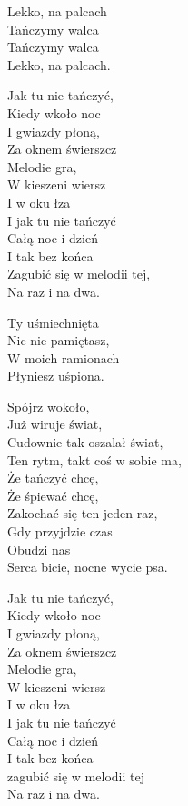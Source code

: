 \begin{text}
    Lekko, na palcach\\
    Tańczymy walca\\
    Tańczymy walca\\
    Lekko, na palcach.

    Jak tu nie tańczyć,\\
    Kiedy wkoło noc\\
    I gwiazdy płoną,\\
    Za oknem świerszcz\\
    Melodie gra,\\
    W kieszeni wiersz\\
    I w oku łza\\
    I jak tu nie tańczyć\\
    Całą noc i dzień\\
    I tak bez końca\\
    Zagubić się w melodii tej,\\
    Na raz i na dwa.

    Ty uśmiechnięta\\
    Nic nie pamiętasz,\\
    W moich ramionach\\
    Płyniesz uśpiona.

    Spójrz wokoło,\\
    Już wiruje świat,\\
    Cudownie tak oszalał świat,\\
    Ten rytm, takt coś w sobie ma,\\
    Że tańczyć chcę,\\
    Że śpiewać chcę,\\
    Zakochać się ten jeden raz,\\
    Gdy przyjdzie czas\\
    Obudzi nas\\
    Serca bicie, nocne wycie psa.

    Jak tu nie tańczyć,\\
    Kiedy wkoło noc\\
    I gwiazdy płoną,\\
    Za oknem świerszcz\\
    Melodie gra,\\
    W kieszeni wiersz\\
    I w oku łza\\
    I jak tu nie tańczyć\\
    Całą noc i dzień\\
    I tak bez końca\\
    zagubić się w melodii tej\\
    Na raz i na dwa.
\end{text}
